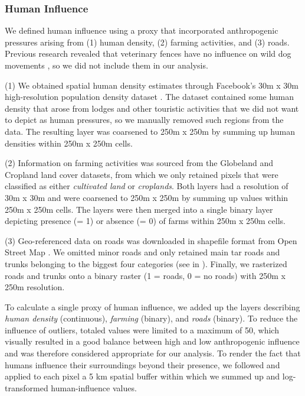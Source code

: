 \documentclass[abstract=on,10pt,a4paper,bibliography=totocnumbered]{scrartcl}
\begin{document}
\subsubsection{Human Influence}
We defined human influence using a proxy that incorporated anthropogenic
pressures arising from (1) human density, (2) farming activities, and (3) roads.
Previous research revealed that veterinary fences have no influence on wild dog
movements \citep{Cozzi.2013b}, so we did not include them in our analysis.

(1) We obtained spatial human density estimates through Facebook's 30m x 30m
high-resolution population density dataset \citep{Facebook.2019}. The dataset
contained some human density that arose from lodges and other touristic
activities that we did not want to depict as human pressures, so we manually
removed such regions from the data. The resulting layer was coarsened to 250m x
250m by summing up human densities within 250m x 250m cells.

(2) Information on farming activities was sourced from the Globeland
\citep{Chen.2015} and Cropland \citep{Xiong.2017} land cover datasets, from
which we only retained pixels that were classified as either \textit{cultivated
land} or \textit{croplands}. Both layers had a resolution of 30m x 30m and were
coarsened to 250m x 250m by summing up values within 250m x 250m cells. The
layers were then merged into a single binary layer depicting presence (= 1) or
absence (= 0) of farms within 250m x 250m cells.

(3) Geo-referenced data on roads was downloaded in shapefile format from Open
Street Map \citep{OpenStreetMap.2019}. We omitted minor roads and only retained
main tar roads and trunks belonging to the biggest four categories (see
 in ). Finally, we
rasterized roads and trunks onto a binary raster (1 = roads, 0 = no roads) with
250m x 250m resolution.

To calculate a single proxy of human influence, we added up the layers
describing \textit{human density} (continuous), \textit{farming} (binary), and
\textit{roads} (binary). To reduce the influence of outliers, totaled values
were limited to a maximum of 50, which visually resulted in a good balance
between high and low anthropogenic influence and was therefore considered
appropriate for our analysis. To render the fact that humans influence their
surroundings beyond their presence, we followed \cite{Elliot.2014} and applied
to each pixel a 5 km spatial buffer within which we summed up and log-transformed
human-influence values.
\end{document}
